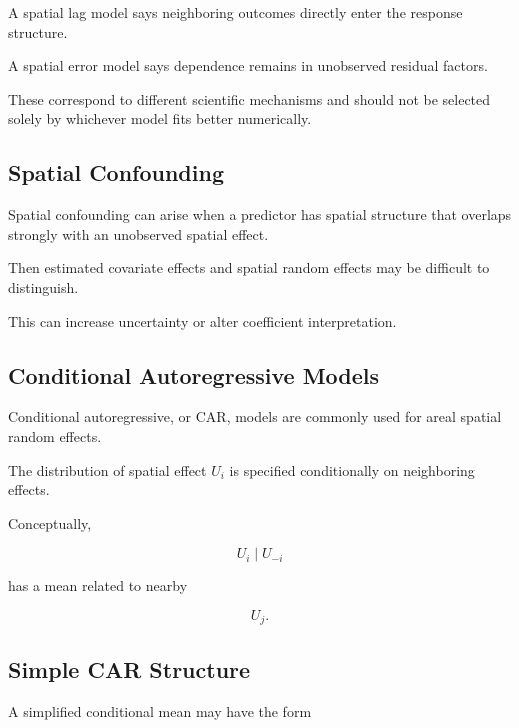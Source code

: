 A spatial lag model says neighboring outcomes directly enter the response
structure.

A spatial error model says dependence remains in unobserved residual
factors.

These correspond to different scientific mechanisms and should not be
selected solely by whichever model fits better numerically.

\subsection{Spatial Confounding}
\label{subsec:spatial-confounding}

Spatial confounding can arise when a predictor has spatial structure that
overlaps strongly with an unobserved spatial effect.

Then estimated covariate effects and spatial random effects may be
difficult to distinguish.

This can increase uncertainty or alter coefficient interpretation.

\subsection{Conditional Autoregressive Models}
\label{subsec:conditional-autoregressive-models}

Conditional autoregressive, or CAR, models are commonly used for areal
spatial random effects.

The distribution of spatial effect \(U_i\) is specified conditionally on
neighboring effects.

Conceptually,

\[
\boxed{
U_i
\mid
U_{-i}
}
\]

has a mean related to nearby

\[
U_j.
\]

\subsection{Simple CAR Structure}
\label{subsec:simple-car-structure}

A simplified conditional mean may have the form

